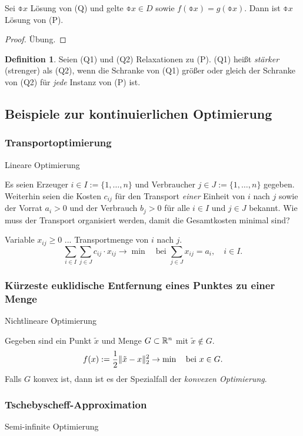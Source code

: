 \documentclass[
 a4paper,
 12pt,
 parskip=half
 ]{scrartcl}
\theoremstyle{plain}
\theoremstyle{definition}
\newtheorem{defn}{Definition}
\numberwithin{equation}{section}
\begin{document}
\begin{thm}
  Sei $\obar{x}$ Lösung von (Q) und gelte $\obar{x} \in D$ sowie $f(\obar{x}) =
  g(\obar{x})$. Dann ist $\obar{x}$ Lösung von (P).
\end{thm}

\begin{proof}
  Übung.
\end{proof}

\begin{defn}
  Seien (Q1) und (Q2) Relaxationen zu (P). (Q1) heißt \emph{stärker} (strenger)
  als (Q2), wenn die Schranke von (Q1) größer oder gleich der Schranke von (Q2)
  für \emph{jede} Instanz von (P) ist.
\end{defn}

\subsection{Beispiele zur kontinuierlichen Optimierung}
\subsubsection{Transportoptimierung}
Lineare Optimierung

Es seien Erzeuger $i \in I := \{1, \ldots, n\}$ und Verbraucher $j \in J := \{1,
\ldots, n\}$ gegeben. Weiterhin seien die Kosten $c_{ij}$ für den Transport
\emph{einer} Einheit von $i$ nach $j$ sowie der Vorrat $a_i > 0$ und der
Verbrauch $b_j > 0$ für alle $i \in I$ und $j \in J$ bekannt. Wie muss der
Transport organisiert werden, damit die Gesamtkosten minimal sind?

Variable $x_{ij} \ge 0$ ... Transportmenge von $i$ nach $j$.
\[ \sum_{i \in I} \sum_{j \in J} c_{ij} \cdot x_{ij} \to \min \quad \text{bei }
  \sum_{j \in J} x_{ij} = a_i, \quad i \in I. \]

\subsubsection{Kürzeste euklidische Entfernung eines Punktes zu einer Menge}
Nichtlineare Optimierung

Gegeben sind ein Punkt $\tilde{x}$ und Menge $G \subset \mathbb{R}^n$ mit $\tilde{x}
\notin G$.
\[ f(x) := \frac{1}{2} \| \tilde{x} - x \|_2^2 \to \min \quad \text{bei } x \in
G. \]
Falls $G$ konvex ist, dann ist es der Spezialfall der \emph{konvexen
  Optimierung}.

\subsubsection{Tschebyscheff-Approximation}
Semi-infinite Optimierung
\end{document}
